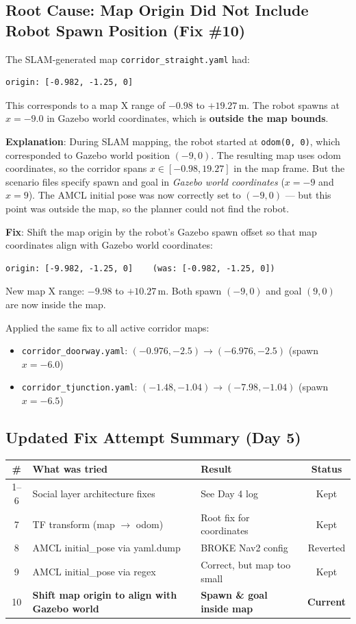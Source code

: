 \documentclass[11pt]{article}
\newcommand{\logentry}[1]{\subsection*{#1}}
\begin{document}
\logentry{Root Cause: Map Origin Did Not Include Robot Spawn Position (Fix \#10)}
The SLAM-generated map \texttt{corridor\_straight.yaml} had:
\begin{verbatim}
origin: [-0.982, -1.25, 0]
\end{verbatim}
This corresponds to a map X range of $-0.98$ to $+19.27$\,m. The robot spawns
at $x = -9.0$ in Gazebo world coordinates, which is \textbf{outside the map bounds}.

\textbf{Explanation}: During SLAM mapping, the robot started at \texttt{odom(0, 0)},
which corresponded to Gazebo world position $(-9, 0)$. The resulting map uses odom
coordinates, so the corridor spans $x \in [-0.98, 19.27]$ in the map frame. But the
scenario files specify spawn and goal in \emph{Gazebo world coordinates} ($x = -9$
and $x = 9$). The AMCL initial pose was now correctly set to $(-9, 0)$ --- but this
point was outside the map, so the planner could not find the robot.

\textbf{Fix}: Shift the map origin by the robot's Gazebo spawn offset so that map
coordinates align with Gazebo world coordinates:
\begin{verbatim}
origin: [-9.982, -1.25, 0]    (was: [-0.982, -1.25, 0])
\end{verbatim}
New map X range: $-9.98$ to $+10.27$\,m. Both spawn $(-9, 0)$ and goal $(9, 0)$
are now inside the map.

Applied the same fix to all active corridor maps:
\begin{itemize}
  \item \texttt{corridor\_doorway.yaml}: $(-0.976, -2.5) \to (-6.976, -2.5)$
        (spawn $x = -6.0$)
  \item \texttt{corridor\_tjunction.yaml}: $(-1.48, -1.04) \to (-7.98, -1.04)$
        (spawn $x = -6.5$)
\end{itemize}

\logentry{Updated Fix Attempt Summary (Day 5)}
\begin{center}
\begin{tabular}{|c|p{5cm}|p{4cm}|c|}
\hline
\textbf{\#} & \textbf{What was tried} & \textbf{Result} & \textbf{Status} \\
\hline
1--6 & Social layer architecture fixes & See Day 4 log & Kept \\
\hline
7 & TF transform (map $\to$ odom) & Root fix for coordinates & Kept \\
\hline
8 & AMCL initial\_pose via yaml.dump & BROKE Nav2 config & Reverted \\
\hline
9 & AMCL initial\_pose via regex & Correct, but map too small & Kept \\
\hline
10 & \textbf{Shift map origin to align with Gazebo world} & \textbf{Spawn \& goal inside map} & \textbf{Current} \\
\hline
\end{tabular}
\end{center}
\end{document}
